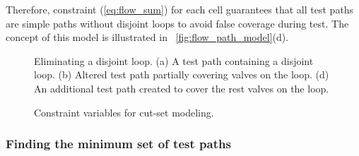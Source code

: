 Therefore, constraint (\ref{eq:flow_sum}) for each cell guarantees that all
test paths are simple paths without disjoint loops to avoid false coverage
during test. The concept of 
this model is illustrated in \figname~\ref{fig:flow_path_model}(d).

\begin{figure*}[t]
{
\figurefontsize
  \begin{minipage}[b]{0.70\textwidth}
\centering

\caption{Eliminating a disjoint loop. (a) A test path containing a disjoint loop.
(b) Altered test path partially covering valves on the loop. (d) An additional
test path created to cover the rest valves on the loop.}
\label{fig:minimum_loops}
\end{minipage}
\hspace{10pt}
  \begin{minipage}[b]{0.28\textwidth}
\hskip 30pt
\vspace{10pt}
    \caption{Constraint variables for cut-set modeling.}
    \label{fig:cut_var}
  \end{minipage}
}
\end{figure*}

\subsubsection{Finding the minimum set of test paths} 

